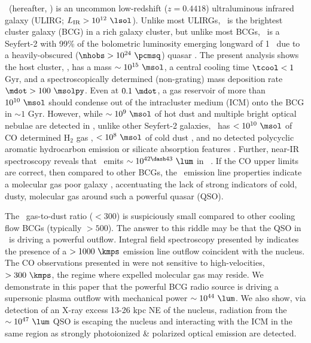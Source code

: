 \documentclass[useAMS,usenatbib]{mn2e}
\begin{document}
\iras\ (hereafter, \irs) is an uncommon low-redshift ($z = 0.4418$)
ultraluminous infrared galaxy (ULIRG; $L_{\mathrm{IR}} > 10^{12}
~\lsol$). Unlike most ULIRGs, \irs\ is the brightest cluster galaxy
(BCG) in a rich galaxy cluster, but unlike most BCGs, \irs\ is a
Seyfert-2 with 99\% of the bolometric luminosity emerging longward of
1 \mymicron\ due to a heavily-obscured ($\nhobs > 10^{24} ~\pcmsq$)
quasar \citep{1988ApJ...328..161K, 1993ApJ...415...82H,
  1994ApJ...436L..51F, 1998ApJ...506..205E, 2000A&A...353..910F,
  2001MNRAS.321L..15I}. The present analysis shows the host cluster,
\rxj, has a mass $\sim 10^{15} ~\msol$, a central cooling time $\tcool
< 1$ Gyr, and a spectroscopically determined (non-grating) mass
deposition rate $\mdot > 100 ~\msolpy$. Even at $0.1 ~\mdot$, a gas
reservoir of more than $10^{10} ~\msol$ should condense out of the
intracluster medium (ICM) onto the BCG in $\sim 1$ Gyr. However, while
$\sim 10^9 ~\msol$ of hot dust \citep{1997A&A...318L...1T} and
multiple bright optical nebulae are detected in \irs, unlike other
Seyfert-2 galaxies, \irs\ has $< 10^{10} ~\msol$ of CO determined
H$_2$ gas \citep{1998ApJ...506..205E}, $< 10^8 ~\msol$ of cold dust
\citep{2001MNRAS.326.1467D}, and no detected polycyclic aromatic
hydrocarbon emission or silicate absorption features
\citep{2004ApJ...613..986P, 2008ApJ...683..114S}. Further, near-IR
spectroscopy reveals that \irs\ emits $\sim 10^{42 \dash 43} ~\lum$ in
\halpha\ \citep{1996MNRAS.283.1003C, 1998ApJ...506..205E}. If the CO
upper limits are correct, then compared to other BCGs, the
\irs\ emission line properties indicate a molecular gas poor galaxy
\citep{2001MNRAS.328..762E}, accentuating the lack of strong
indicators of cold, dusty, molecular gas around such a powerful quasar
(QSO).

The \irs\ gas-to-dust ratio ($< 300$) is suspiciously small compared
to other cooling flow BCGs (typically $> 500$). The answer to this
riddle may be that the QSO in \irs\ is driving a powerful
outflow. Integral field spectroscopy presented by
\citet{1996MNRAS.283.1003C} indicates the presence of a $> 1000
~\kmps$ emission line outflow coincident with the nucleus. The CO
observations presented in \citet{1998ApJ...506..205E} were not
sensitive to high-velocities, $> 300 ~\kmps$, the regime where
expelled molecular gas may reside. We demonstrate in this paper that
the powerful BCG radio source is driving a supersonic plasma outflow
with mechanical power $\sim 10^{44} ~\lum$. We also show, via
detection of an X-ray excess 13-26 kpc NE of the nucleus, radiation
from the $\sim 10^{47} ~\lum$ QSO is escaping the nucleus and
interacting with the ICM in the same region as strongly photoionized
\& polarized optical emission are detected.
\end{document}
